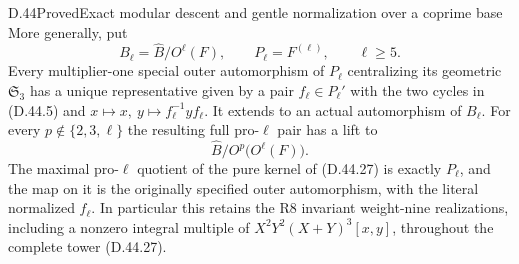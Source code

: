 \begin{statement}{D.44}{Proved}{Exact modular descent and gentle normalization over a coprime base}
More generally, put
\[
 B_\ell=\widehat B/O^\ell(F),\qquad
 P_\ell=F^{(\ell)},\qquad \ell\geq5.
 \tag{D.44.26}
\]
Every multiplier-one special outer automorphism of \(P_\ell\)
centralizing its geometric \(\mathfrak S_3\) has a unique
representative given by a pair \(f_\ell\in P_\ell'\) with
the two cycles in \textup{(D.44.5)} and
\(x\mapsto x,\ y\mapsto f_\ell^{-1}yf_\ell\).
It extends to an actual automorphism of \(B_\ell\).
For every \(p\notin\{2,3,\ell\}\) the resulting full
pro-\(\ell\) pair has a lift to
\[
       \widehat B/O^p\!\bigl(O^\ell(F)\bigr).
 \tag{D.44.27}
\]
The maximal pro-\(\ell\) quotient of the pure kernel of
\textup{(D.44.27)} is exactly \(P_\ell\), and the map
on it is the originally specified outer automorphism,
with the literal normalized \(f_\ell\).
In particular this retains the R8 invariant weight-nine
realizations, including a nonzero integral multiple of
\(X^2Y^2(X+Y)^3[x,y]\), throughout the complete tower
\textup{(D.44.27)}.
\end{statement}

